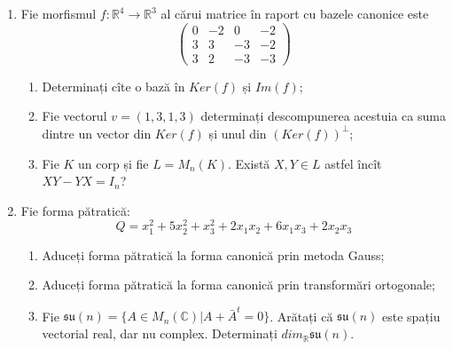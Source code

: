 \documentclass{article}
\begin{document}
\begin{enumerate}
 \item Fie morfismul $f:\mathbb{R}^4 \to \mathbb{R}^3$ al cărui matrice în raport cu bazele canonice este
$$\begin{pmatrix}
0&-2&0&-2\\
3&3&-3&-2\\
3&2&-3&-3
\end{pmatrix}$$

\begin{enumerate}
\item Determinați cîte o bază în $Ker(f)$ și $Im(f)$;
\item Fie vectorul $v=(1,3,1,3)$ determinați descompunerea acestuia ca suma dintre un vector din $Ker(f)$ și unul din $(Ker(f))^\perp$;
\item Fie $K$ un corp și fie $L=M_n(K)$. Există $X,Y \in L$ astfel încît $XY-YX=I_n$?  
\end{enumerate}
\item Fie forma pătratică:
$$Q= x_1^2+5x_2^2+x_3^2+2x_1x_2+6x_1x_3+2x_2x_3$$

\begin{enumerate}
\item Aduceți forma pătratică la forma canonică prin metoda Gauss;
\item Aduceți forma pătratică la forma canonică prin transformări ortogonale;
\item Fie $\mathfrak{su}(n)=\{ A \in M_n(\mathbb{C}) | A+\bar{A}^t=0\}$. Arătați că $\mathfrak{su}(n)$ este spațiu vectorial real, dar nu complex.
Determinați $dim_{\mathbb{R}}\mathfrak{su}(n)$.
\end{enumerate}
\end{enumerate}
\newpage
\end{document}
